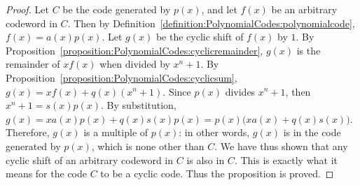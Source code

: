 \begin{proof}{}
Let $C$ be the code generated by $p(x)$, and let $f(x)$ be an arbitrary codeword in $C$.  Then by Definition~\ref{definition:PolynomialCodes:polynomialcode}, $f(x)= a(x)p(x)$.  Let $g(x)$ be the cyclic shift of $f(x)$ by $1$. By Proposition~\ref{proposition:PolynomialCodes:cyclicremainder}, $g(x)$ is the remainder of  $xf(x)$  when divided by $x^n+1$.  By Proposition~\ref{proposition:PolynomialCodes:cyclicsum},  $g(x)=xf(x) +  q(x)(x^n + 1)$. Since $p(x)$ divides $x^n+1$, then $x^n+1=s(x)p(x)$.  By substitution, $g(x)=xa(x)p(x) +  q(x)s(x)p(x)=p(x)\bigg(xa(x)+  q(x)s(x)\bigg)$. Therefore, $g(x)$ is a multiple of $p(x)$: in other words, $g(x)$ is in the code generated by $p(x)$, which is none other than $C$. We have thus shown that any cyclic shift of an arbitrary codeword in $C$ is also in $C$. This is exactly what it means for the code $C$ to be a cyclic code. Thus the proposition is proved.
\end{proof}









